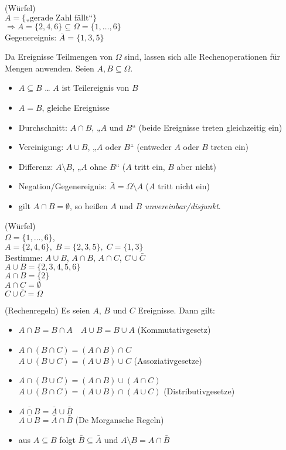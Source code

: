  (Würfel)\\
$A=\{\text{„gerade Zahl fällt“}\}$\\
$\Rightarrow A=\{2,4,6\} \subseteq \Omega = \{1,\dots,6\}$\\
Gegenereignis: $\bar A = \{1,3,5\}$

 Da Ereignisse Teilmengen von $\Omega$ sind, lassen sich alle Rechenoperationen für Mengen anwenden. Seien $A,B \subseteq \Omega$.
\begin{itemize}
\item $A \subseteq B$ … $A$ ist Teilereignis von $B$
\item $A=B$, gleiche Ereignisse
\item Durchschnitt: $A \cap B$, „$A$ und $B$“ (beide Ereignisse treten gleichzeitig ein)
\item Vereinigung: $A \cup B$, „$A$ oder $B$“ (entweder $A$ oder $B$ treten ein)
\item Differenz: $A \setminus B$, „$A$ ohne $B$“ ($A$ tritt ein, $B$ aber nicht)
\item Negation/Gegenereignis: $\bar A = \Omega\setminus A$ ($A$ tritt nicht ein)
\item gilt $A \cap B = \emptyset$, so heißen $A$ und $B$ \emph{unvereinbar/disjunkt}.
\end{itemize}

 (Würfel)\\
$\Omega = \{1,\dots,6\}$,\\
$A=\{2,4,6\},\; B=\{2,3,5\},\; C =\{1,3\}$\\
Bestimme: $A \cup B$, $A \cap B$, $A \cap C$, $C \cup \bar C$\\
$A \cup B = \{2,3,4,5,6\}$\\
$A \cap B = \{2\}$\\
$A \cap C = \emptyset$\\
$C \cup \bar C = \Omega$

 (Rechenregeln) Es seien $A$, $B$ und $C$ Ereignisse. Dann gilt:
\begin{itemize}
\item $A \cap B = B \cap A \quad A \cup B = B \cup A$ \tab(Kommutativgesetz)
\item $A \cap (B \cap C)=(A \cap B) \cap C$\\
$A \cup (B \cup C) = (A \cup B ) \cup C$ \tab\tab (Assoziativgesetze)
\item $A \cap (B \cup C) = (A \cap B) \cup (A \cap C)$\\
$A \cup(B \cap C) = (A \cup B) \cap (A \cup C)$ \tab (Distributivgesetze)
\item $\overline{A\cap B} = \bar A \cup \bar B$\\
$\overline{A \cup B} = \bar A \cap \bar B$ \tab\tab (De Morgansche Regeln)
\item aus $A \subseteq B$ folgt $\bar B \subseteq \bar A$ und $A\setminus B=A \cap \bar B$
\end{itemize}

